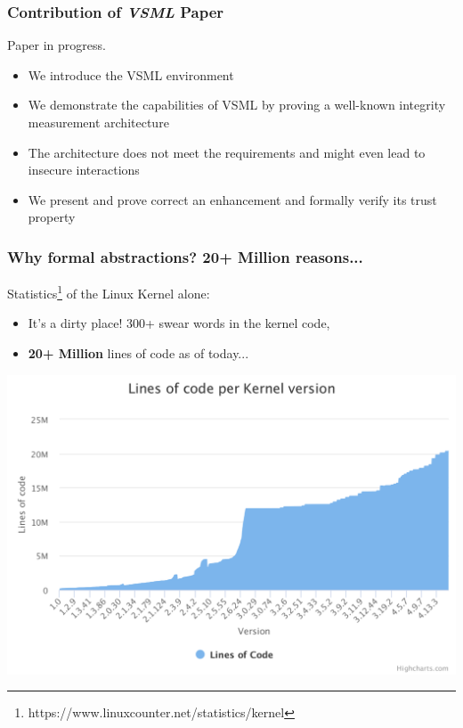 \documentclass[aspectratio=169] {beamer}
\begin{document}
\begin{frame}\frametitle{Contribution of \emph{VSML} Paper}
Paper in progress.
\vfill
\begin{itemize}
	\item We introduce the VSML environment
	\item We demonstrate the capabilities of VSML by proving a well-known integrity measurement architecture
	\item The architecture does not meet the requirements and might even lead to insecure interactions
	\item We present and prove correct an enhancement and formally verify its trust property
\end{itemize}
\end{frame}

\begin{frame}\frametitle{Why formal abstractions? 20+ Million reasons...}
Statistics\footnote{\scriptsize https://www.linuxcounter.net/statistics/kernel} of the Linux Kernel alone:
\begin{itemize}
	\item It's a dirty place! 300+ swear words in the kernel code,
	\item \textbf{20+ Million} lines of code as of today...
\end{itemize}
\centering
\includegraphics[scale=0.2]{bilder/kernelstat}
\end{frame}
\end{document}
